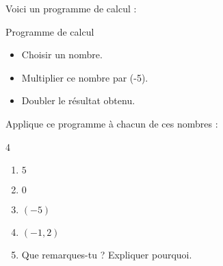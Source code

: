 \begin{exercice*}
    Voici un programme de calcul :
    \begin{myProgCalculBox}{Programme de calcul}
        \begin{itemize}
            \item Choisir un nombre.
            \item Multiplier ce nombre par (-5).
            \item Doubler le résultat obtenu.
        \end{itemize}
    \end{myProgCalculBox}
   
    Applique ce programme à chacun de ces nombres :
    \begin{multicols}4
        \begin{enumerate}
            \item $ 5 $
            \item $ 0 $
            \item $ (-5) $
            \item $ (-1,2) $
        \end{enumerate}
    \end{multicols}
    \begin{enumerate}
        \setcounter{enumi}{4}
        \item Que remarques-tu ? Expliquer pourquoi.
    \end{enumerate}
        
\end{exercice*}
